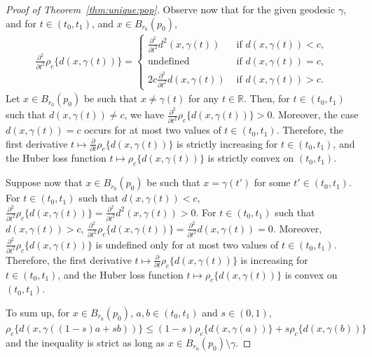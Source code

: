 \documentclass[preprint]{imsart}
\theoremstyle{plain}
\theoremstyle{remark}
\begin{document}
\begin{appendix}
\begin{proof}[Proof of Theorem~\ref{thm:unique:pop}]
Observe now that for the given geodesic $\gamma$, and for $t \in (t_0,t_1)$, and $x \in B_{r_0}(p_0)$, 
\begin{align*}
    \tfrac{\partial^2}{\partial t^2}\rho_c\{d(x, \gamma(t))\} = \begin{cases}
          \tfrac{\partial^2}{\partial t^2} d^2(x, \gamma(t)) & \mbox{ if } d(x, \gamma(t)) < c, \\
        \mbox{undefined} & \mbox{ if } d(x, \gamma(t)) = c, \\
        2c  \tfrac{\partial^2}{\partial t^2} d(x, \gamma(t)) & \mbox{ if } d(x, \gamma(t)) > c. 
    \end{cases}
\end{align*}Let $x \in B_{r_0}(p_0)$ be such that $x \neq \gamma(t)$ for any $t \in \mathbb{R}$. 
Then, for $t \in (t_0,t_1)$ such that $d(x, \gamma(t)) \neq c$, we have $\tfrac{\partial^2}{\partial t^2}\rho_c\{d(x, \gamma(t))\} > 0$.
Moreover, the case $d(x, \gamma(t)) = c$ occurs for at most two values of $t \in (t_0,t_1)$. Therefore, the first derivative $t \mapsto \tfrac{\partial}{\partial t}\rho_c\{d(x, \gamma(t))\}$ is strictly increasing for $t \in (t_0,t_1)$, and the Huber loss function 
$t \mapsto \rho_c\{d(x, \gamma(t))\} $ is strictly convex on $(t_0,t_1)$. 

 

Suppose now that $x \in B_{r_0}(p_0)$ be such that $x = \gamma(t')$ for some $t' \in (t_0,t_1)$. 
For $t \in (t_0,t_1)$ such that $d(x, \gamma(t))  < c$, $\tfrac{\partial^2}{\partial t^2}\rho_c\{d(x, \gamma(t))\} = \tfrac{\partial^2}{\partial t^2} d^2(x, \gamma(t)) > 0$. 
For $t \in (t_0,t_1)$ such that $d(x, \gamma(t))  > c$, $\tfrac{\partial^2}{\partial t^2}\rho_c\{d(x, \gamma(t))\} = \tfrac{\partial^2}{\partial t^2} d(x, \gamma(t)) = 0$. Moreover, $\tfrac{\partial^2}{\partial t^2}\rho_c\{d(x, \gamma(t))\}$ is undefined only for at most two values of $t \in (t_0,t_1)$. Therefore, the first derivative $t \mapsto \tfrac{\partial}{\partial t}\rho_c\{d(x, \gamma(t))\}$ is increasing for $t \in (t_0,t_1)$, and the Huber loss function 
$t \mapsto \rho_c\{d(x, \gamma(t))\} $ is convex on $(t_0,t_1)$. 

To sum up, for $x \in B_{r_0}(p_0)$, $a,b \in (t_0,t_1)$ and $s \in (0,1)$, 
$\rho_c\{d(x, \gamma((1-s)a + sb))\} \le (1-s)\rho_c\{d(x, \gamma(a))\} + s\rho_c\{d(x, \gamma(b))\}$ and the inequality is strict as long as $x \in B_{r_0}(p_0) \setminus \gamma$.


\end{proof}
\end{appendix}
\end{document}

